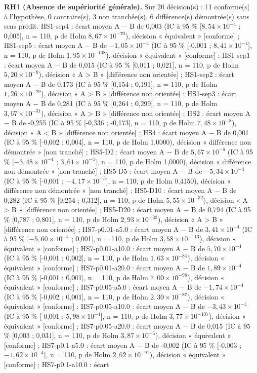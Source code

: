 \textbf{RH1 (Absence de supériorité générale).} Sur 20 décision(s) : 11 conforme(s) à l'hypothèse, 0 contraire(s), 3 non tranchée(s), 6 différence(s) démontrée(s) sans sens prédit. HS1-sep4 : écart moyen A $-$ B de 0,003 (IC à 95 \% [$8{,}54 \times 10^{-4}$ ; 0,005], n = 110, p de Holm $8{,}67 \times 10^{-70}$), décision « équivalent » [conforme] ; HS1-sep5 : écart moyen A $-$ B de $-1{,}05 \times 10^{-4}$ (IC à 95 \% [-0,001 ; $8{,}41 \times 10^{-4}$], n = 110, p de Holm $1{,}95 \times 10^{-108}$), décision « équivalent » [conforme] ; HS1-sep1 : écart moyen A $-$ B de 0,015 (IC à 95 \% [0,011 ; 0,021], n = 110, p de Holm $5{,}20 \times 10^{-9}$), décision « A > B » [différence non orientée] ; HS1-sep2 : écart moyen A $-$ B de 0,173 (IC à 95 \% [0,154 ; 0,191], n = 110, p de Holm $1{,}26 \times 10^{-29}$), décision « A > B » [différence non orientée] ; HS1-sep3 : écart moyen A $-$ B de 0,281 (IC à 95 \% [0,264 ; 0,299], n = 110, p de Holm $3{,}67 \times 10^{-31}$), décision « A > B » [différence non orientée] ; HS2 : écart moyen A $-$ B de -0,255 (IC à 95 \% [-0,336 ; -0,173], n = 110, p de Holm $7{,}48 \times 10^{-8}$), décision « A < B » [différence non orientée] ; HS4 : écart moyen A $-$ B de 0,001 (IC à 95 \% [-0,002 ; 0,004], n = 110, p de Holm 1,0000), décision « différence non démontrée » [non tranché] ; HS5-D2 : écart moyen A $-$ B de $5{,}67 \times 10^{-6}$ (IC à 95 \% [$-3{,}48 \times 10^{-4}$ ; $3{,}61 \times 10^{-4}$], n = 110, p de Holm 1,0000), décision « différence non démontrée » [non tranché] ; HS5-D5 : écart moyen A $-$ B de $-5{,}34 \times 10^{-4}$ (IC à 95 \% [-0,001 ; $-4{,}17 \times 10^{-5}$], n = 110, p de Holm 0,4150), décision « différence non démontrée » [non tranché] ; HS5-D10 : écart moyen A $-$ B de 0,282 (IC à 95 \% [0,254 ; 0,312], n = 110, p de Holm $5{,}55 \times 10^{-32}$), décision « A > B » [différence non orientée] ; HS5-D20 : écart moyen A $-$ B de 0,794 (IC à 95 \% [0,787 ; 0,801], n = 110, p de Holm $2{,}93 \times 10^{-32}$), décision « A > B » [différence non orientée] ; HS7-p0.01-a5.0 : écart moyen A $-$ B de $3{,}41 \times 10^{-4}$ (IC à 95 \% [$-5{,}60 \times 10^{-4}$ ; 0,001], n = 110, p de Holm $3{,}58 \times 10^{-113}$), décision « équivalent » [conforme] ; HS7-p0.01-a10.0 : écart moyen A $-$ B de $5{,}70 \times 10^{-4}$ (IC à 95 \% [-0,001 ; 0,002], n = 110, p de Holm $1{,}63 \times 10^{-84}$), décision « équivalent » [conforme] ; HS7-p0.01-a20.0 : écart moyen A $-$ B de $1{,}89 \times 10^{-4}$ (IC à 95 \% [-0,001 ; 0,001], n = 110, p de Holm $7{,}00 \times 10^{-98}$), décision « équivalent » [conforme] ; HS7-p0.05-a5.0 : écart moyen A $-$ B de $-1{,}74 \times 10^{-4}$ (IC à 95 \% [-0,002 ; 0,001], n = 110, p de Holm $2{,}30 \times 10^{-87}$), décision « équivalent » [conforme] ; HS7-p0.05-a10.0 : écart moyen A $-$ B de $-3{,}43 \times 10^{-4}$ (IC à 95 \% [-0,001 ; $5{,}98 \times 10^{-4}$], n = 110, p de Holm $3{,}77 \times 10^{-107}$), décision « équivalent » [conforme] ; HS7-p0.05-a20.0 : écart moyen A $-$ B de 0,015 (IC à 95 \% [0,003 ; 0,031], n = 110, p de Holm $3{,}87 \times 10^{-5}$), décision « équivalent » [conforme] ; HS7-p0.1-a5.0 : écart moyen A $-$ B de -0,002 (IC à 95 \% [-0,003 ; $-1{,}62 \times 10^{-4}$], n = 110, p de Holm $2{,}62 \times 10^{-91}$), décision « équivalent » [conforme] ; HS7-p0.1-a10.0 : écart 